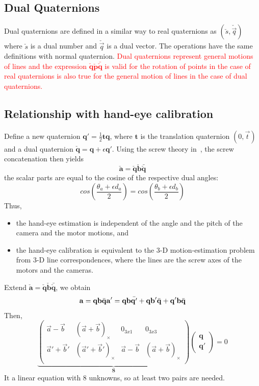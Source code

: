 \subsection{Dual Quaternions}
Dual quaternions are defined in a similar way to real quaternions
as $(\check{s}, \check{\vec{q}})$ where $\check{s}$ is a dual number and $\check{\vec{q}}$ is a dual vector. The operations have the same definitions with normal quaternion. \textcolor{red}{Dual quaternions represent general motions of lines and the expression $\check{\mathbf{q}}\check{\mathbf{p}}\bar{\check{\mathbf{q}}}$ is valid for the rotation of points in the case of real quaternions is also true for the general motion of lines in the case of dual quaternions.}
\subsection{Relationship with hand-eye calibration}
Define a new quaternion $\mathbf{q}'=\frac{1}{2}\mathbf{t}\mathbf{q}$, where $\mathbf{t}$ is the translation quaternion $(0, \vec{t})$ and a dual quaternion $\check{\mathbf{q}}=\mathbf{q}+\epsilon \mathbf{q'}$. Using the screw theory in~\cite{daniilidis1999hand}, the screw concatenation then yields
$$
\check{\mathbf{a}}=\check{\mathbf{q}}\check{\mathbf{b}}\bar{\check{\mathbf{q}}}
$$
the scalar parts are equal to the cosine of the respective dual angles:
$$
cos(\frac{\theta_a+\epsilon d_a}{2})=cos(\frac{{\theta_b}+\epsilon d_b}{2})
$$
Thus, 
\begin{itemize}
\item the hand-eye estimation is independent of the angle and
the pitch of the camera and the motor motions, and
\item the hand-eye calibration is equivalent to the 3-D
motion-estimation problem from 3-D line correspondences,
where the lines are the screw axes of the motors
and the cameras.
\end{itemize}
Extend $\check{\mathbf{a}}=\check{\mathbf{q}}\check{\mathbf{b}}\bar{\check{\mathbf{q}}}$, we obtain
$$
\mathbf{a}=\mathbf{q}\mathbf{b}\bar{\mathbf{q}} \\
\mathbf{a'}=\mathbf{q}\mathbf{b}\bar{\mathbf{q}'} + \mathbf{q}\mathbf{b}'\bar{\mathbf{q}}+\mathbf{q}'\mathbf{b}\bar{\mathbf{q}}\\
$$
Then, 
$$
\underbrace{
\left(
\begin{matrix}
\vec{a}-\vec{b} & (\vec{a}+\vec{b})_{\times} & 0_{3x1} & 0_{3x3} \\
\vec{a}'+\vec{b}' & (\vec{a}'+\vec{b}')_{\times} & \vec{a}-\vec{b} & (\vec{a}+\vec{b})_{\times} \\
\end{matrix}
\right)}_{\mathbf{S}}
\left(
\begin{matrix}
\mathbf{q} \\
\mathbf{q}'
\end{matrix}
\right)=0
$$
It a linear equation with $8$ unknowns, so at least two pairs are needed.
